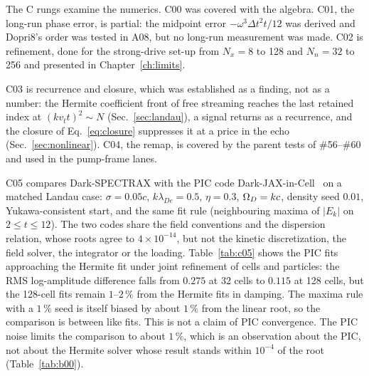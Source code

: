 The C rungs examine the numerics. C00 was covered with the algebra. C01, the long-run phase error, is partial: the midpoint error $-\omega^3\Delta t^2t/12$ was derived and Dopri8's order was tested in A08, but no long-run measurement was made. C02 is refinement, done for the strong-drive set-up from $N_x=8$ to 128 and $N_n=32$ to 256 and presented in Chapter~\ref{ch:limits}.

C03 is recurrence and closure, which was established as a finding, not as a number: the Hermite coefficient front of free streaming reaches the last retained index at $(kv_tt)^2\sim N$ (Sec.~\ref{sec:landau}), a signal returns as a recurrence, and the closure of Eq.~\eqref{eq:closure} suppresses it at a price in the echo (Sec.~\ref{sec:nonlinear}).\label{sec:recurrence} C04, the remap, is covered by the parent tests of \#56--\#60 and used in the pump-frame lanes.

C05 compares Dark-SPECTRAX with the PIC code Dark-JAX-in-Cell~\cite{DarkJIC} on a matched Landau case: $\sigma=0.05c$, $k\lambda_{De}=0.5$, $\eta=0.3$, $\Omega_D=kc$, density seed $0.01$, Yukawa-consistent start, and the same fit rule (neighbouring maxima of $|E_k|$ on $2\le t\le12$). The two codes share the field conventions and the dispersion relation, whose roots agree to $4\times10^{-14}$, but not the kinetic discretization, the field solver, the integrator or the loading. Table~\ref{tab:c05} shows the PIC fits approaching the Hermite fit under joint refinement of cells and particles: the RMS log-amplitude difference falls from $0.275$ at 32 cells to $0.115$ at 128 cells, but the 128-cell fits remain $1$--$2\,\%$ from the Hermite fits in damping. The maxima rule with a $1\,\%$ seed is itself biased by about $1\,\%$ from the linear root, so the comparison is between like fits. This is not a claim of PIC convergence. The PIC noise limits the comparison to about $1\,\%$, which is an observation about the PIC, not about the Hermite solver whose result stands within $10^{-4}$ of the root (Table~\ref{tab:b00}).

\begin{table}[t]
\caption{C05: Landau fits (maxima rule) of the Hermite solver and of the PIC at increasing resolution, ordinary and dark; the last column is the RMS difference of $\ln|E_k|$ with Hermite.}\label{tab:c05}
\small
{}
\end{table}

